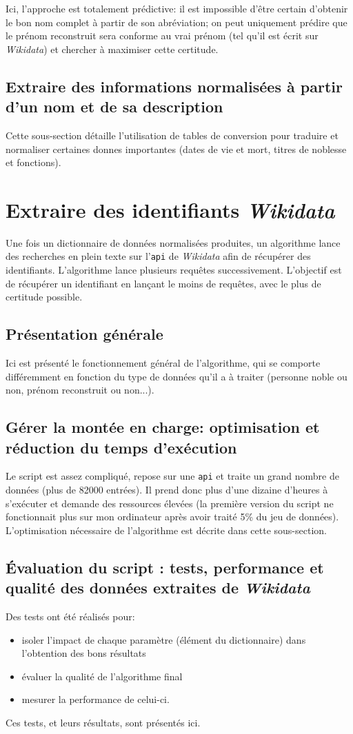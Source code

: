 \documentclass[a4paper, 12pt, twoside]{book}
\newcommand{\api}{\texttt{\gls{api}}}
\newcommand{\wkd}{\textit{Wikidata}}
\begin{document}
Ici, l'approche est totalement prédictive: il est impossible d'être certain d'obtenir le bon nom complet à partir de son abréviation; on peut uniquement prédire que le prénom reconstruit sera conforme au vrai prénom (tel qu'il est écrit sur \wkd{}) et chercher à maximiser cette certitude.

\subsection{Extraire des informations normalisées à partir d'un nom et de sa description}
Cette sous-section détaille l'utilisation de tables de conversion pour traduire et normaliser certaines donnes importantes (dates de vie et mort, titres de noblesse et fonctions).

\section{Extraire des identifiants \wkd{}}
Une fois un dictionnaire de données normalisées produites, un algorithme lance des recherches en plein texte sur l'\api{} de \wkd{} afin de récupérer des identifiants. L'algorithme lance plusieurs requêtes successivement. L'objectif est de récupérer un identifiant en lançant le moins de requêtes, avec le plus de certitude possible.

\subsection{Présentation générale}
Ici est présenté le fonctionnement général de l'algorithme, qui se comporte différemment en fonction du type de données qu'il a à traiter (personne noble ou non, prénom reconstruit ou non...).

\subsection{Gérer la montée en charge: optimisation et réduction du temps d'exécution}
Le script est assez compliqué, repose sur une \api{} et traite un grand nombre de données (plus de 82000 entrées). Il prend donc plus d'une dizaine d'heures à s'exécuter et demande des ressources élevées (la première version du script ne fonctionnait plus sur mon ordinateur après avoir traité 5\% du jeu de données). L'optimisation nécessaire de l'algorithme est décrite dans cette sous-section.

\subsection{Évaluation du script : tests, performance et qualité des données extraites de \wkd{}}
Des tests ont été réalisés pour:
\begin{itemize}
	\item isoler l'impact de chaque paramètre (élément du dictionnaire) dans l'obtention des bons résultats
	\item évaluer la qualité de l'algorithme final
	\item mesurer la performance de celui-ci.
\end{itemize}
Ces tests, et leurs résultats, sont présentés ici.
\end{document}
